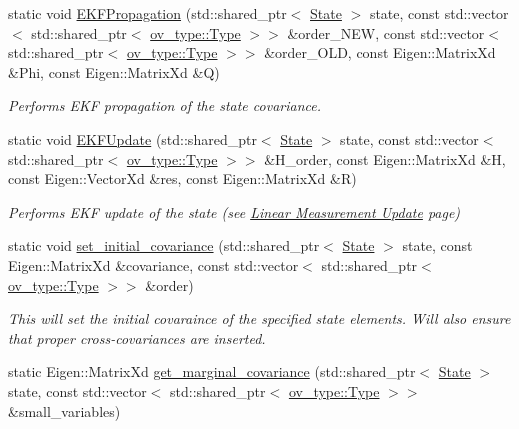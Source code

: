\begin{DoxyCompactItemize}
\item 
static void \hyperlink{classov__msckf_1_1StateHelper_a31f92fdf5bac87bfc23d34334af7bd4d}{E\+K\+F\+Propagation} (std\+::shared\+\_\+ptr$<$ \hyperlink{classov__msckf_1_1State}{State} $>$ state, const std\+::vector$<$ std\+::shared\+\_\+ptr$<$ \hyperlink{classov__type_1_1Type}{ov\+\_\+type\+::\+Type} $>$$>$ \&order\+\_\+\+N\+EW, const std\+::vector$<$ std\+::shared\+\_\+ptr$<$ \hyperlink{classov__type_1_1Type}{ov\+\_\+type\+::\+Type} $>$$>$ \&order\+\_\+\+O\+LD, const Eigen\+::\+Matrix\+Xd \&Phi, const Eigen\+::\+Matrix\+Xd \&Q)
\begin{DoxyCompactList}\small\item\em Performs E\+KF propagation of the state covariance. \end{DoxyCompactList}\item 
static void \hyperlink{classov__msckf_1_1StateHelper_a471d81fcc22b706654556950931067fd}{E\+K\+F\+Update} (std\+::shared\+\_\+ptr$<$ \hyperlink{classov__msckf_1_1State}{State} $>$ state, const std\+::vector$<$ std\+::shared\+\_\+ptr$<$ \hyperlink{classov__type_1_1Type}{ov\+\_\+type\+::\+Type} $>$$>$ \&H\+\_\+order, const Eigen\+::\+Matrix\+Xd \&H, const Eigen\+::\+Vector\+Xd \&res, const Eigen\+::\+Matrix\+Xd \&R)
\begin{DoxyCompactList}\small\item\em Performs E\+KF update of the state (see \hyperlink{update_linear-meas}{Linear Measurement Update} page) \end{DoxyCompactList}\item 
static void \hyperlink{classov__msckf_1_1StateHelper_a5f19646a05e77e67d5be2da8aed19f14}{set\+\_\+initial\+\_\+covariance} (std\+::shared\+\_\+ptr$<$ \hyperlink{classov__msckf_1_1State}{State} $>$ state, const Eigen\+::\+Matrix\+Xd \&covariance, const std\+::vector$<$ std\+::shared\+\_\+ptr$<$ \hyperlink{classov__type_1_1Type}{ov\+\_\+type\+::\+Type} $>$$>$ \&order)
\begin{DoxyCompactList}\small\item\em This will set the initial covaraince of the specified state elements. Will also ensure that proper cross-\/covariances are inserted. \end{DoxyCompactList}\item 
static Eigen\+::\+Matrix\+Xd \hyperlink{classov__msckf_1_1StateHelper_a23ec77c8411dcc7cfed64273f6882805}{get\+\_\+marginal\+\_\+covariance} (std\+::shared\+\_\+ptr$<$ \hyperlink{classov__msckf_1_1State}{State} $>$ state, const std\+::vector$<$ std\+::shared\+\_\+ptr$<$ \hyperlink{classov__type_1_1Type}{ov\+\_\+type\+::\+Type} $>$$>$ \&small\+\_\+variables)
$$
\end{DoxyCompactItemize}
